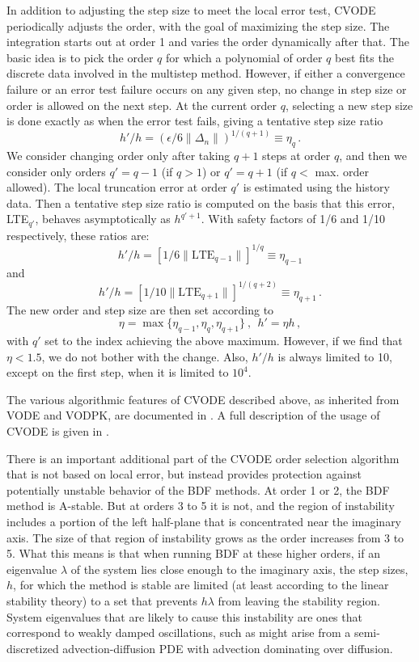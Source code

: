 In addition to adjusting the step size to meet the local error test,
CVODE periodically adjusts the order, with the goal of maximizing the
step size.  The integration starts out at order 1 and varies the order
dynamically after that.  The basic idea is to pick the order $q$ for
which a polynomial of order $q$ best fits the discrete data involved
in the multistep method.  However, if either a convergence failure or
an error test failure occurs on any given step, no change in step
size or order is allowed on the next step.  At the current order $q$,
selecting a new step size is done exactly as when the error test
fails, giving a tentative step size ratio
\[ h'/h = (\epsilon / 6 \|\Delta_n\| )^{1/(q+1)} \equiv \eta_q \, . \]
We consider changing order only after taking $q+1$ steps at order $q$,
and then we consider only orders $q' = q - 1$ (if $q > 1$) or
$q' = q + 1$ (if $q < $ max. order allowed).  The local truncation
error at order $q'$ is estimated using the history data.  Then a
tentative step size ratio is computed on the basis that this error,
LTE$_{q'}$, behaves asymptotically as $h^{q'+1}$.  With safety factors
of 1/6 and 1/10 respectively, these ratios are:
\[ h'/h = [1 / 6 \|\mbox{LTE}_{q-1}\| ]^{1/q} \equiv \eta_{q-1} \]
and
\[ h'/h = [1 / 10 \|\mbox{LTE}_{q+1}\| ]^{1/(q+2)} \equiv \eta_{q+1} \, . \]
The new order and step size are then set according to
\[ \eta = \max\{\eta_{q-1},\eta_q,\eta_{q+1}\} ~,~~ h' = \eta h \, , \]
with $q'$ set to the index achieving the above maximum.
However, if we find that $\eta < 1.5$, we do not bother with the
change.  Also, $h'/h$ is always limited to 10, except on the first
step, when it is limited to $10^4$.

The various algorithmic features of CVODE described above, as
inherited from VODE and VODPK, are documented in
\cite{BBH:89,Byr:92,Hin:00}.  A full description of the usage
of CVODE is given in \cite{HiSe:04cvode}.

There is an important additional part of the CVODE order selection
algorithm that is not based on local error, but instead provides
protection against potentially unstable behavior of the BDF
methods. At order 1 or 2, the BDF method is A-stable.  But at
orders 3 to 5 it is not, and the region of instability includes a
portion of the left half-plane that is concentrated near the
imaginary axis.  The size of that region of instability grows as
the order increases from 3 to 5. What this means is that when
running BDF at these higher orders, if an eigenvalue $\lambda$ of
the system lies close enough to the imaginary axis, the step
sizes, $h$, for which the method is stable are limited (at least
according to the linear stability theory) to a set that prevents
$h\lambda$ from leaving the stability region.  System eigenvalues
that are likely to cause this instability are ones that correspond
to weakly damped oscillations, such as might arise from a
semi-discretized advection-diffusion PDE with advection dominating
over diffusion.


